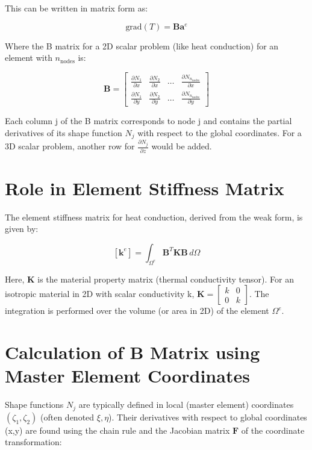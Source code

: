 \documentclass[
  11pt,
  a4paper,
]{scrbook}
\begin{document}
This can be written in matrix form as:

\[\text{grad}(T) = \mathbf{B} \mathbf{a}^e\]

Where the B matrix for a 2D scalar problem (like heat conduction) for an
element with \(n_{\text{nodes}}\) is:

\[\mathbf{B} = \begin{bmatrix}
\frac{\partial N_1}{\partial x} & \frac{\partial N_2}{\partial x} & \ldots & \frac{\partial N_{n_{\text{nodes}}}}{\partial x} \\
\frac{\partial N_1}{\partial y} & \frac{\partial N_2}{\partial y} & \ldots & \frac{\partial N_{n_{\text{nodes}}}}{\partial y}
\end{bmatrix}\]

Each column j of the B matrix corresponds to node j and contains the
partial derivatives of its shape function \(N_j\) with respect to the
global coordinates. For a 3D scalar problem, another row for
\(\frac{\partial N_j}{\partial z}\) would be added.

\section{Role in Element Stiffness
Matrix}\label{role-in-element-stiffness-matrix}

The element stiffness matrix for heat conduction, derived from the weak
form, is given by:

\[[\mathbf{k}^e] = \int_{\Omega^e} \mathbf{B}^T \mathbf{K} \mathbf{B} \, d\Omega\]

Here, \(\mathbf{K}\) is the material property matrix (thermal
conductivity tensor). For an isotropic material in 2D with scalar
conductivity k,
\(\mathbf{K} = \begin{bmatrix} k & 0 \\ 0 & k \end{bmatrix}\). The
integration is performed over the volume (or area in 2D) of the element
\(\Omega^e\).

\section{Calculation of B Matrix using Master Element
Coordinates}\label{calculation-of-b-matrix-using-master-element-coordinates}

Shape functions \(N_j\) are typically defined in local (master element)
coordinates \((\zeta_1, \zeta_2)\) (often denoted \(\xi, \eta\)). Their
derivatives with respect to global coordinates (x,y) are found using the
chain rule and the Jacobian matrix \(\mathbf{F}\) of the coordinate
transformation:
\end{document}

